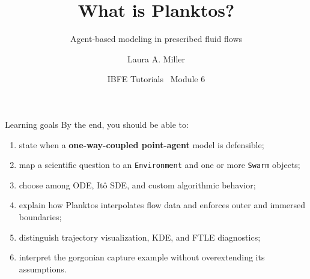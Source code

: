 \documentclass[aspectratio=169,11pt]{beamer}
\title[What is Planktos?]{What is Planktos?}
\subtitle{Agent-based modeling in prescribed fluid flows}
\author[Miller]{Laura A. Miller}
\institute[UArizona]{Department of Mathematics, University of Arizona}
\date{IBFE Tutorials \textbullet\ Module 6}
\newcommand{\code}[1]{\texttt{#1}}
\begin{document}
\begin{frame}[plain]
%
\maketutorialtitle
\end{frame}

\begin{frame}{Learning goals}
By the end, you should be able to:
\begin{enumerate}
  \item state when a \textbf{one-way-coupled point-agent} model is defensible;
  \item map a scientific question to an \code{Environment} and one or more \code{Swarm} objects;
  \item choose among ODE, It\^o SDE, and custom algorithmic behavior;
  \item explain how Planktos interpolates flow data and enforces outer and immersed boundaries;
  \item distinguish trajectory visualization, KDE, and FTLE diagnostics;
  \item interpret the gorgonian capture example without overextending its assumptions.
\end{enumerate}
\end{frame}
\end{document}
